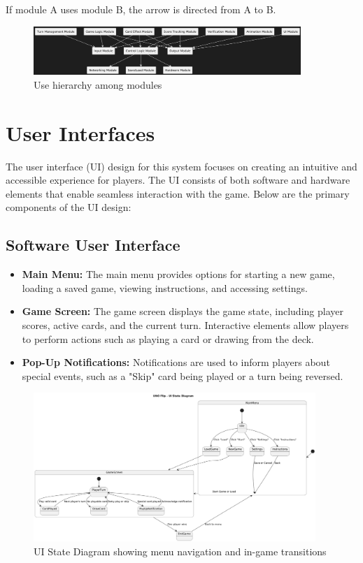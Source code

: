 \documentclass[12pt, titlepage]{article}
\begin{document}
If module A uses module B, the arrow is directed from A to B.

\begin{figure}[H]
\centering
\includegraphics[width=0.9\textwidth]{output.png}
\caption{Use hierarchy among modules}
\label{FigUH}
\end{figure}

\section{User Interfaces}

The user interface (UI) design for this system focuses on creating an intuitive and accessible experience for players. The UI consists of both software and hardware elements that enable seamless interaction with the game. Below are the primary components of the UI design:

\subsection{Software User Interface}
\begin{itemize}
    \item \textbf{Main Menu:} The main menu provides options for starting a new game, loading a saved game, viewing instructions, and accessing settings.
    \item \textbf{Game Screen:} The game screen displays the game state, including player scores, active cards, and the current turn. Interactive elements allow players to perform actions such as playing a card or drawing from the deck.
    \item \textbf{Pop-Up Notifications:} Notifications are used to inform players about special events, such as a "Skip" card being played or a turn being reversed.
\end{itemize}

\begin{figure}[H]
\centering
\includegraphics[width=0.95\textwidth]{ui-diagram.png}
\caption{UI State Diagram showing menu navigation and in-game transitions}
\label{fig:ui-diagram}
\end{figure}
\end{document}
